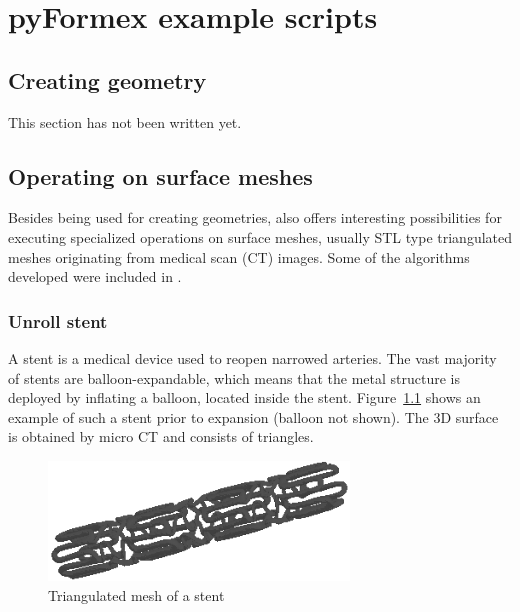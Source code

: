 
\chapter{pyFormex example scripts}
\label{cha:examples}

\section{Creating geometry}
\label{sec:creating-geometry}

This section has not been written yet.

\section{Operating on surface meshes}
\label{sec:operating-surf-mesh}

Besides being used for creating geometries, \pyf also offers interesting possibilities for executing specialized operations on surface meshes, usually STL type triangulated meshes originating from medical scan (CT) images. Some of the algorithms developed were included in \pyf.

\subsection{Unroll stent}
\label{sec:unroll-stent}

A stent is a medical device used to reopen narrowed arteries. The vast majority of stents are balloon-expandable, which means that the metal structure is deployed by inflating a balloon, located inside the stent. Figure~\ref{fig:cypher-stent} shows an example of such a stent prior to expansion (balloon not shown). The 3D surface is obtained by micro CT and consists of triangles.

\begin{figure}[h]
  \centering
  \begin{makeimage}
  \end{makeimage}
  \begin{latexonly}
    \includegraphics[width=8cm]{images/cypher-stent}
  \end{latexonly}
  \begin{htmlonly}
  \end{htmlonly}  
  \caption{Triangulated mesh of a stent}
  \label{fig:cypher-stent}
\end{figure}

